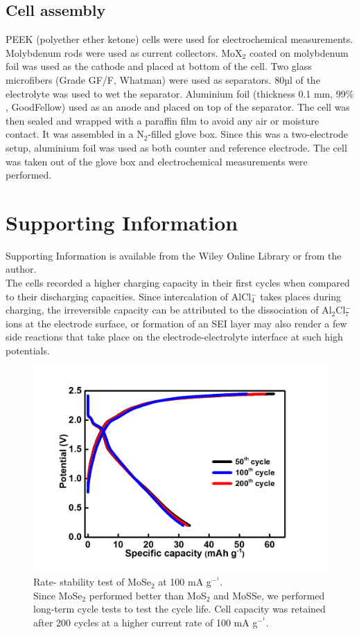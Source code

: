 \documentclass[num-refs]{wiley-article}
\begin{document}
\subsection{Cell assembly}
PEEK (polyether ether ketone) cells were used for electrochemical measurements. Molybdenum rods were used as current collectors. MoX$_2$ coated on molybdenum foil was used as the cathode and placed at bottom of the cell. Two glass microfibers (Grade GF/F, Whatman) were used as separators. 80µl of the electrolyte was used to wet the separator. Aluminium foil (thickness 0.1 mm, 99$\%$, GoodFellow) used as an anode and placed on top of the separator. The cell was then sealed and wrapped with a paraffin film to avoid any air or moisture contact. It was assembled in a N$_2$-filled glove box. Since this was a two-electrode setup, aluminium foil was used as both counter and reference electrode. The cell was taken out of the glove box and electrochemical measurements were performed. 
\section*{Supporting Information}
Supporting  Information  is  available  from  the  Wiley  Online  Library  or  from the author.
\\The cells recorded a higher charging capacity in their first cycles when compared to their discharging capacities. Since intercalation of AlCl$_4^-$ takes places during charging, the irreversible capacity can be attributed to the dissociation of Al$_2$Cl$_7^-$ ions at the electrode surface, or formation of an SEI layer may also render a few side reactions that take place on the electrode-electrolyte interface at such high potentials. 
\begin{figure}[h!]
\centering
\includegraphics[width=\textwidth]{SF/SF1}
\caption{Rate- stability test of MoSe$_2$ at 100 mA g$^-^1$. \\Since MoSe$_2$ performed better than MoS$_2$ and MoSSe, we performed long-term cycle tests to test the cycle life. Cell capacity was retained after 200 cycles at a higher current rate of 100 mA g$^-^1$.}
\end{figure}
\end{document}
